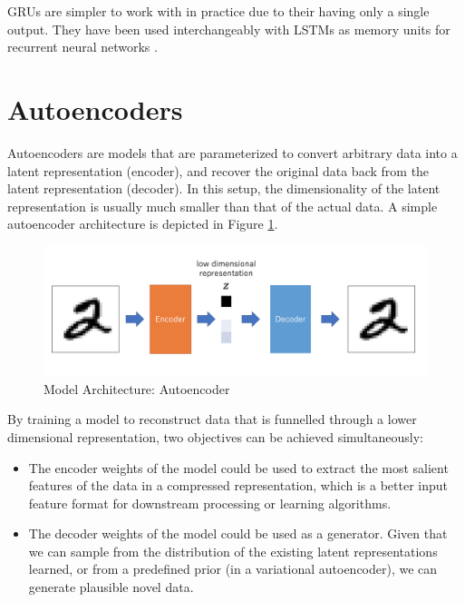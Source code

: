 GRUs are simpler to work with in practice due to their having only a single output. They have been used interchangeably with LSTMs as memory units for recurrent neural networks \citep{chung2015gated,fu2017style}.


\section{Autoencoders}

Autoencoders are models that are parameterized to convert arbitrary data into a latent representation (encoder), and recover the original data back from the latent representation (decoder). In this setup, the dimensionality of the latent representation is usually much smaller than that of the actual data. A simple autoencoder architecture is depicted in Figure \ref{fig:autoencoder-structure}.

\begin{figure}[ht]
	\centering
	\includegraphics[width=\textwidth]{images/autoencoder-structure}
	\caption{\label{fig:autoencoder-structure} Model Architecture: Autoencoder}
\end{figure}

By training a model to reconstruct data that is funnelled through a lower dimensional representation, two objectives can be achieved simultaneously:
\begin{itemize}
	\item The encoder weights of the model could be used to extract the most salient features of the data in a compressed representation, which is a better input feature format for downstream processing or learning algorithms. \citep{hinton2006reducing}
	\item The decoder weights of the model could be used as a generator. Given that we can sample from the distribution of the existing latent representations learned, or from a predefined prior (in a variational autoencoder), we can generate plausible novel data.
\end{itemize}

